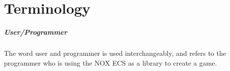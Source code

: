 \section{Terminology}
\subparagraph{User/Programmer}
The word user and programmer is used interchangeably, and refers to the programmer who is using
the NOX ECS as a library to create a game.
